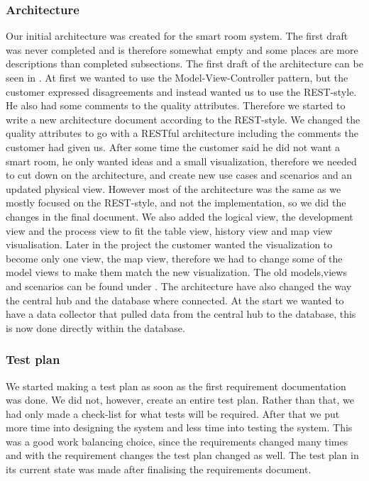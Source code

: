 \documentclass[../document.tex]{subfiles}
\begin{document}
\subsubsection{Architecture}
Our initial architecture was created for the smart room system. The first draft was never completed and is therefore somewhat empty and some places are more descriptions than completed subsections. The first draft of the architecture can be seen in . At first we wanted to use the Model-View-Controller pattern, but the customer expressed disagreements and instead wanted us to use the \gls{REST}-style. He also had some comments to the quality attributes. Therefore we started to write a new architecture document according to the \gls{REST}-style. We changed the quality attributes to go with a RESTful architecture including the comments the customer had given us. After some time the customer said he did not want a smart room, he only wanted ideas and a small visualization, therefore we needed to cut down on the architecture, and create new use cases and scenarios and an updated physical view. However most of the architecture was the same as we mostly focused on the \gls{REST}-style, and not the implementation, so we did the changes in the final document. We also added the logical view, the development view and the process view to fit the table view, history view and map view visualisation. Later in the project the customer wanted the visualization to become only one view, the map view, therefore we had to change some of the model views to make them match the new visualization. The old models,views and scenarios can be found under . The architecture have also changed the way the central hub and the database where connected. At the start we wanted to have a data collector that pulled data from the central hub to the database, this is now done directly within the database.

\subsubsection{Test plan}
We started making a test plan as soon as the first requirement documentation was done. We did not, however, create an entire test plan. Rather than that, we had only made a check-list for what tests will be required. After that we put more time into designing the system and less time into testing the system. This was a good work balancing choice, since the requirements changed many times and with the requirement changes the test plan changed as well. The test plan in its current state was made after finalising the requirements document.
\end{document}
